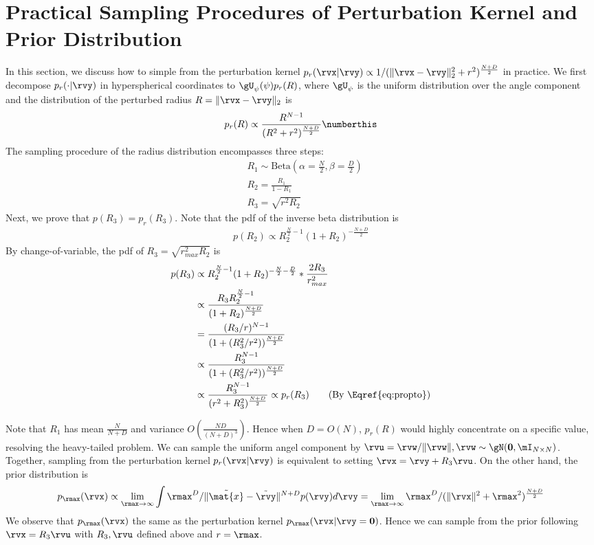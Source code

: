 \section{Practical Sampling Procedures of Perturbation Kernel and Prior Distribution}
\label{app:sample-prior}
In this section, we discuss how to simple from the perturbation kernel $p_{r}(\rvx|{\rvy}) \propto {1}/{({\|\rvx-{\rvy}\|_2^2+ r^2})^\frac{N+D}{2}}$ in practice. We first decompose $p_r(\cdot|\rvy)$ in hyperspherical coordinates to $\gU_{\psi}(\psi)p_r(R)$, where $\gU_{\psi}$ is the uniform distribution over the angle component and the distribution of the perturbed radius $R=\|\rvx - \rvy\|_2$ is
\begin{align*}
    p_r(R) \propto \frac{R^{N-1}}{({R^2+ r^2})^\frac{N+D}{2}} \numberthis \label{eq:propto}
\end{align*}
The sampling procedure of the radius distribution encompasses three steps:
\begin{align*}
    &R_1 \sim \textrm{Beta}(\alpha=\frac{N}{2}, \beta=\frac{D}{2})\\
    &R_2=\frac{R_1}{1-R_1}\\
    &R_3= \sqrt{r^2 R_2}
\end{align*}
Next, we prove that $p(R_3) = p_r(R_3)$. Note that the pdf of the inverse beta distribution is
\begin{align*}
    p(R_2) \propto R_2^{\frac{N}{2}-1}(1+R_2)^{-\frac{N+D}{2}}
\end{align*}
By change-of-variable, the pdf of $R_3=\sqrt{r_{max}^2 R_2}$ is
\begin{align*}
    p(R_3) &\propto R_2^{{\frac{N}{2}-1}}(1+R_2)^{-\frac{N}{2}-\frac{D}{2}}*\frac{2R_3}{r_{max}^2}\\
    &\propto\frac{R_3R_2^{\frac{N}{2}-1}}{(1+R_2)^{\frac{N+D}{2}}}\\
    &= \frac{(R_3/r)^{N-1}}{(1+(R_3^2/r^2))^{\frac{N+D}{2}}}\\
    &\propto  \frac{R_3^{N-1}}{(1+(R_3^2/r^2))^{\frac{N+D}{2}}}\\
    &\propto  \frac{R_3^{N-1}}{(r^2+R_3^2)^{\frac{N+D}{2}}} \propto p_{r}(R_3)\qquad \textrm{(By \Eqref{eq:propto})}
\end{align*}

Note that $R_1$ has mean $\frac{N}{N+D}$ and variance $O(\frac{ND}{(N+D)^3})$. Hence when $D=O(N)$,  $p_{r}(R)$ would highly concentrate on a specific value, resolving the heavy-tailed problem. We can sample the uniform angel component by $\rvu = \rvw/\|\rvw\|, \rvw \sim \gN(\mathbf{0}, \mI_{N \times N})$. Together, sampling from the perturbation kernel $p_{r}(\rvx|{\rvy}) $ is equivalent to setting $\rvx = \rvy + R_3\rvu$. On the other hand, the prior distribution is 
\begin{align*}
    p_{\rmax}(\rvx) \propto \lim_{\rmax\to \infty} \int {\rmax^D}/{\|\tilde{\mat{x}}-\tilde{\rvy}\|^{N+D}}p(\rvy)d\rvy= \lim_{\rmax\to \infty}{\rmax^D}/{(\|\rvx\|^2+\rmax^2)^\frac{N+D}{2}}
\end{align*}
We observe that $p_{\rmax}(\rvx)$ the same as the perturbation kernel $p_{\rmax}(\rvx|{\rvy}=\bf{0})$. Hence we can sample from the prior following $\rvx = R_3\rvu$ with $R_3, \rvu$ defined above and $r=\rmax$.


